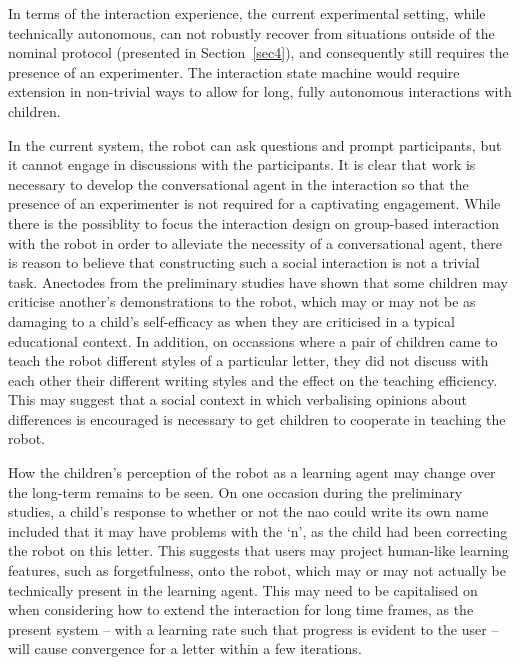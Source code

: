 \documentclass{sig-alternate}
\begin{document}
In terms of the interaction experience, the current experimental setting, while
technically autonomous, can not robustly recover from situations outside of the
nominal protocol (presented in Section~\ref{sec4}), and consequently still
requires the presence of an experimenter. The interaction state machine would
require extension in non-trivial ways to allow for long, fully autonomous
interactions with children.

In the current system, the robot can ask questions and prompt participants, but it 
cannot engage in discussions with the participants. It is clear that work is necessary 
to develop the conversational agent in the interaction so that the presence of an 
experimenter is not required for a captivating engagement. While there is the 
possiblity to focus the interaction design on group-based interaction with the robot 
in order to alleviate the necessity of a conversational agent, there is reason to 
believe that constructing such a social interaction is not a trivial task. Anectodes 
from the preliminary studies have shown that some children may criticise another's 
demonstrations to the robot, which may or may not be as damaging to a child's 
self-efficacy as when they are criticised in a typical educational context. In addition,
on occassions where a pair of children came to teach the robot different styles of a 
particular letter, they did not discuss with each other their different writing styles 
and the effect on the teaching efficiency. This may suggest that a social context in 
which verbalising opinions about differences is encouraged is necessary to get children 
to cooperate in teaching the robot.  

How the children's perception of the robot as a learning agent may change over the 
long-term remains to be seen. On one occasion during the preliminary studies, a 
child's response to whether or not the {\sc nao} could write its own name included that it 
may have problems with the `n', as the child had been correcting the robot on this 
letter. This suggests that users may project human-like learning features, such as 
forgetfulness, onto the robot, which may or may not actually be technically present 
in the learning agent. This may need to be capitalised on when considering how to 
extend the interaction for long time frames, as the present system -- with a learning rate 
such that progress is evident to the user -- will cause convergence for a letter within a 
few iterations.
\end{document}
